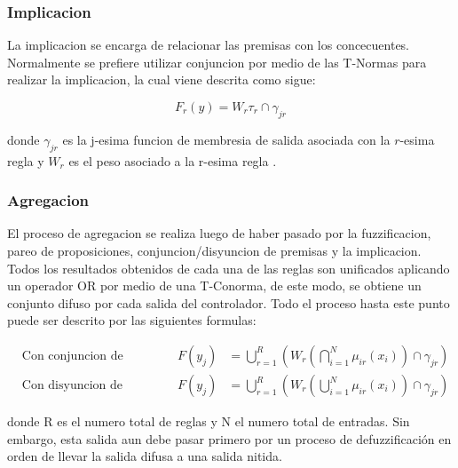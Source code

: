         \subsubsection{Implicacion}

            La implicacion se encarga de relacionar las premisas con los concecuentes. Normalmente se prefiere utilizar conjuncion por medio de las T-Normas para realizar la implicacion, la cual viene descrita como sigue:

            \begin{equation}\label{eq:implicacion}
                F_r(y) = W_r \tau_{r} \cap \gamma_{jr}
            \end{equation}

            \noindent donde $\gamma_{jr}$ es la j-esima funcion de membresia de salida asociada con la $r$-esima regla y $W_r$ es el peso asociado a la r-esima regla \Parencite{riid2003transparent}.

        \subsubsection{Agregacion}

            El proceso de agregacion se realiza luego de haber pasado por la fuzzificacion, pareo de proposiciones, conjuncion/disyuncion de premisas y la implicacion. Todos los resultados obtenidos de cada una de las reglas son unificados aplicando un operador OR por medio de una T-Conorma, de este modo, se obtiene un conjunto difuso por cada salida del controlador. Todo el proceso hasta este punto puede ser descrito por las siguientes formulas:

            \vspace{10pt}
            \begin{align}
                &\text{Con conjuncion de premisas:} & F(y_j) &= \bigcup_{r=1}^{R}\left(W_r \left(\bigcap_{i=1}^{N}\mu_{ir}(x_i) \right) \cap \gamma_{jr}\right) \label{eq:fconjuncion} \\
                &\text{Con disyuncion de premisas:} & F(y_j) &= \bigcup_{r=1}^{R}\left(W_r \left(\bigcup_{i=1}^{N}\mu_{ir}(x_i) \right) \cap \gamma_{jr}\right) \label{eq:fdisyuncion}
            \end{align}
            \vspace{10pt}

            \noindent donde R es el numero total de reglas y N el numero total de entradas. Sin embargo, esta salida aun debe pasar primero por un proceso de defuzzificación en orden de llevar la salida difusa a una salida nitida.


